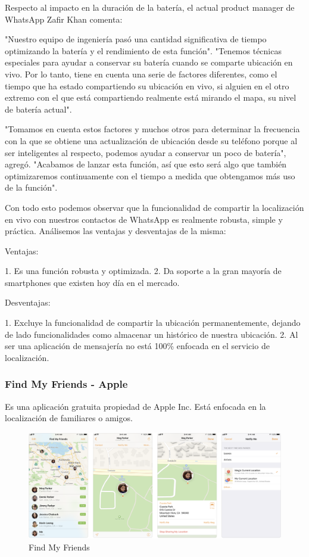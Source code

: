 Respecto al impacto en la duración de la batería, el actual product manager de WhatsApp Zafir Khan comenta: 

"Nuestro equipo de ingeniería pasó una cantidad significativa de tiempo optimizando la batería y el rendimiento de esta función". "Tenemos técnicas especiales para ayudar a conservar su batería cuando se comparte ubicación en vivo. Por lo tanto, tiene en cuenta una serie de factores diferentes, como el tiempo que ha estado compartiendo su ubicación en vivo, si alguien en el otro extremo con el que está compartiendo realmente está mirando el mapa, su nivel de batería actual".

"Tomamos en cuenta estos factores y muchos otros para determinar la frecuencia con la que se obtiene una actualización de ubicación desde su teléfono porque al ser inteligentes al respecto, podemos ayudar a conservar un poco de batería", agregó. "Acabamos de lanzar esta función, así que esto será algo que también optimizaremos continuamente con el tiempo a medida que obtengamos más uso de la función".\cite{zafirKhan}

Con todo esto podemos observar que la funcionalidad de compartir la localización en vivo con nuestros contactos de WhatsApp es realmente robusta, simple y práctica. Análisemos las ventajas y desventajas de la misma:

Ventajas:

1. Es una función robusta y optimizada.
2. Da soporte a la gran mayoría de smartphones que existen hoy día en el mercado.

Desventajas:

1. Excluye la funcionalidad de compartir la ubicación permanentemente, dejando de lado funcionalidades como almacenar un histórico de nuestra ubicación.
2. Al ser una aplicación de mensajería no está 100\% enfocada en el servicio de localización.

\subsubsection{Find My Friends - Apple}

Es una aplicación gratuita propiedad de Apple Inc. Está enfocada en la localización de familiares o amigos.

\begin{figure}[bp!]
	\centering
	\includegraphics[width=5in]{imgs/apple_findmyfriends}
	  \caption{Find My Friends}
\end{figure}

